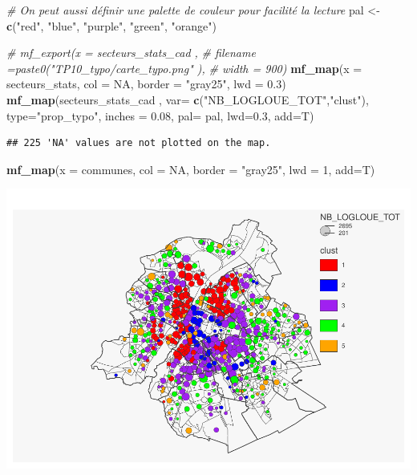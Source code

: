\documentclass[
]{book}
\newenvironment{Shaded}{\begin{snugshade}}{\end{snugshade}}
\newcommand{\AttributeTok}[1]{\textcolor[rgb]{0.13,0.29,0.53}{#1}}
\newcommand{\CommentTok}[1]{\textcolor[rgb]{0.56,0.35,0.01}{\textit{#1}}}
\newcommand{\ConstantTok}[1]{\textcolor[rgb]{0.56,0.35,0.01}{#1}}
\newcommand{\DecValTok}[1]{\textcolor[rgb]{0.00,0.00,0.81}{#1}}
\newcommand{\FloatTok}[1]{\textcolor[rgb]{0.00,0.00,0.81}{#1}}
\newcommand{\FunctionTok}[1]{\textcolor[rgb]{0.13,0.29,0.53}{\textbf{#1}}}
\newcommand{\NormalTok}[1]{#1}
\newcommand{\OtherTok}[1]{\textcolor[rgb]{0.56,0.35,0.01}{#1}}
\newcommand{\StringTok}[1]{\textcolor[rgb]{0.31,0.60,0.02}{#1}}
\begin{document}
\begin{Shaded}
\begin{Highlighting}[]
\CommentTok{\# On peut aussi définir une palette de couleur pour facilité la lecture}
\NormalTok{pal }\OtherTok{\textless{}{-}} \FunctionTok{c}\NormalTok{(}\StringTok{"red"}\NormalTok{, }\StringTok{"blue"}\NormalTok{, }\StringTok{"purple"}\NormalTok{, }\StringTok{"green"}\NormalTok{, }\StringTok{"orange"}\NormalTok{)}

\CommentTok{\# mf\_export(x = secteurs\_stats\_cad ,}
\CommentTok{\#           filename =paste0("TP10\_typo/carte\_typo.png" ),}
\CommentTok{\#           width = 900)}
\FunctionTok{mf\_map}\NormalTok{(}\AttributeTok{x =}\NormalTok{ secteurs\_stats, }\AttributeTok{col =} \ConstantTok{NA}\NormalTok{, }\AttributeTok{border =} \StringTok{"gray25"}\NormalTok{, }\AttributeTok{lwd =} \FloatTok{0.3}\NormalTok{)}
\FunctionTok{mf\_map}\NormalTok{(secteurs\_stats\_cad ,}
       \AttributeTok{var=} \FunctionTok{c}\NormalTok{(}\StringTok{"NB\_LOGLOUE\_TOT"}\NormalTok{,}\StringTok{"clust"}\NormalTok{),}
       \AttributeTok{type=}\StringTok{"prop\_typo"}\NormalTok{,}
       \AttributeTok{inches =} \FloatTok{0.08}\NormalTok{,}
       \AttributeTok{pal=}\NormalTok{ pal,}
       \AttributeTok{lwd=}\FloatTok{0.3}\NormalTok{,}
       \AttributeTok{add=}\NormalTok{T)}
\end{Highlighting}
\end{Shaded}

\begin{verbatim}
## 225 'NA' values are not plotted on the map.
\end{verbatim}

\begin{Shaded}
\begin{Highlighting}[]
\FunctionTok{mf\_map}\NormalTok{(}\AttributeTok{x =}\NormalTok{ communes, }\AttributeTok{col =} \ConstantTok{NA}\NormalTok{, }\AttributeTok{border =} \StringTok{"gray25"}\NormalTok{, }\AttributeTok{lwd =} \DecValTok{1}\NormalTok{, }\AttributeTok{add=}\NormalTok{T)}
\end{Highlighting}
\end{Shaded}

\includegraphics{bookdown-demo_files/figure-latex/unnamed-chunk-105-1.pdf}
\end{document}
